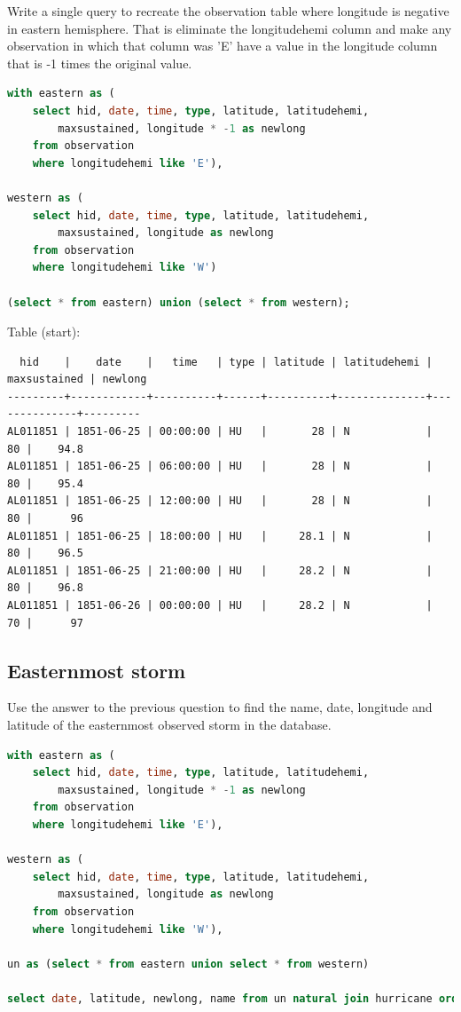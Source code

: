 \documentclass[11pt, oneside]{amsart}   	%
\begin{document}
Write a single query to recreate the observation table where longitude is negative in eastern hemisphere. That is eliminate the longitudehemi column and make any observation in which that column was 'E' have a value in the longitude column that is -1 times the original value.

\begin{lstlisting}[language=SQL]
with eastern as (
    select hid, date, time, type, latitude, latitudehemi, 
        maxsustained, longitude * -1 as newlong
    from observation
    where longitudehemi like 'E'),

western as (
    select hid, date, time, type, latitude, latitudehemi, 
        maxsustained, longitude as newlong
    from observation
    where longitudehemi like 'W')
    
(select * from eastern) union (select * from western);
\end{lstlisting}

Table (start):
\begin{verbatim}
  hid    |    date    |   time   | type | latitude | latitudehemi | maxsustained | newlong
---------+------------+----------+------+----------+--------------+--------------+---------
AL011851 | 1851-06-25 | 00:00:00 | HU   |       28 | N            |           80 |    94.8
AL011851 | 1851-06-25 | 06:00:00 | HU   |       28 | N            |           80 |    95.4
AL011851 | 1851-06-25 | 12:00:00 | HU   |       28 | N            |           80 |      96
AL011851 | 1851-06-25 | 18:00:00 | HU   |     28.1 | N            |           80 |    96.5
AL011851 | 1851-06-25 | 21:00:00 | HU   |     28.2 | N            |           80 |    96.8
AL011851 | 1851-06-26 | 00:00:00 | HU   |     28.2 | N            |           70 |      97
\end{verbatim}


\subsection{Easternmost storm}

Use the answer to the previous question to find the name, date, longitude and latitude of the easternmost observed storm in the database.

\begin{lstlisting}[language=SQL]
with eastern as (
    select hid, date, time, type, latitude, latitudehemi, 
        maxsustained, longitude * -1 as newlong
    from observation
    where longitudehemi like 'E'),

western as (
    select hid, date, time, type, latitude, latitudehemi, 
        maxsustained, longitude as newlong
    from observation
    where longitudehemi like 'W'),
    
un as (select * from eastern union select * from western)

select date, latitude, newlong, name from un natural join hurricane order by newlong limit 1;
\end{lstlisting}
\end{document}
